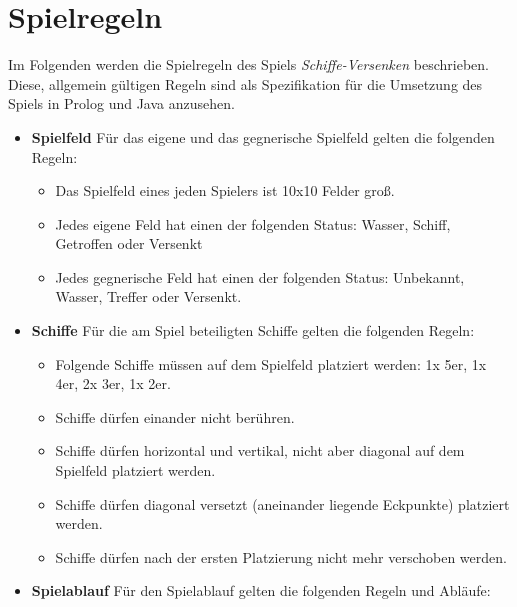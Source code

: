 \section{Spielregeln}
\label{sec:Spielregeln}

Im Folgenden werden die Spielregeln des Spiels \emph{Schiffe-Versenken} beschrieben. Diese, allgemein gültigen Regeln sind als Spezifikation für 
die Umsetzung des Spiels in Prolog und Java anzusehen.


\begin{itemize}
	\item \textbf{Spielfeld} \newline Für das eigene und das gegnerische Spielfeld gelten die folgenden Regeln:
		\begin{itemize}
			\item Das Spielfeld eines jeden Spielers ist 10x10 Felder groß.
			\item Jedes eigene Feld hat einen der folgenden Status: Wasser, Schiff, Getroffen oder Versenkt
			\item Jedes gegnerische Feld hat einen der folgenden Status: Unbekannt, Wasser, Treffer oder Versenkt.
		\end{itemize}
	\item \textbf{Schiffe} \newline Für die am Spiel beteiligten Schiffe gelten die folgenden Regeln:
		\begin{itemize}
			\item Folgende Schiffe müssen auf dem Spielfeld platziert werden: 1x 5er, 1x 4er, 2x 3er, 1x 2er.
			\item Schiffe dürfen einander nicht berühren.
			\item Schiffe dürfen horizontal und vertikal, nicht aber diagonal auf dem Spielfeld platziert werden. %
			\item Schiffe dürfen diagonal versetzt (aneinander liegende Eckpunkte) platziert werden.
			\item Schiffe dürfen nach der ersten Platzierung nicht mehr verschoben werden.
		\end{itemize}
	\item \textbf{Spielablauf} \newline Für den Spielablauf gelten die folgenden Regeln und Abläufe:

\end{itemize}
